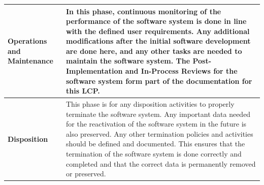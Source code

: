 \begin{xltabular}{\textwidth}{|l|X|}
	\textbf{Operations and Maintenance} & In this phase, continuous monitoring of the performance of the software system is done in line with the defined user requirements. Any additional modifications after the initial software development are done here, and any other tasks are needed to maintain the software system. The Post-Implementation and In-Process Reviews for the software system form part of the documentation for this LCP. \\ \hline
	\textbf{Disposition} & This phase is for any disposition activities to properly terminate the software system. Any important data needed for the reactivation of the software system in the future is also preserved. Any other termination policies and activities should be defined and documented. This ensures that the termination of the software system is done correctly and completed and that the correct data is permanently removed or preserved. \\
\end{xltabular}

